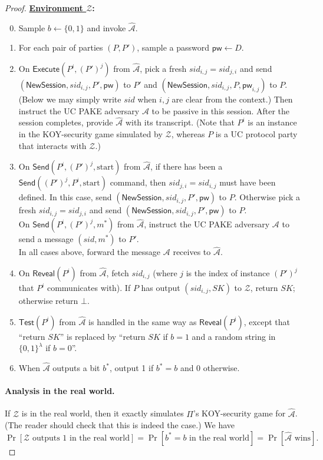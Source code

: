 \documentclass{article}
\newcommand{\adv}{\mathcal{A}}
\newcommand{\env}{\mathcal{Z}}
\newcommand{\pw}{\mathsf{pw}}
\newcommand{\NewSession}{\mathsf{NewSession}}
\newcommand{\Execute}{\mathsf{Execute}}
\newcommand{\Send}{\mathsf{Send}}
\newcommand{\Reveal}{\mathsf{Reveal}}
\newcommand{\Test}{\mathsf{Test}}
\begin{document}
\begin{proof}
\bigskip\noindent\textbf{\underline{Environment $\env$}:}
\begin{enumerate}
\setcounter{enumi}{-1}
  \item Sample $b \gets \{0,1\}$ and invoke $\widehat{\adv}$.
  \item For each pair of parties $(P, P')$, sample a password $\pw \gets D$.
  \item On $\Execute(P^i, (P')^j)$ from $\widehat{\adv}$, pick a fresh $sid_{i,j} = sid_{j,i}$ and send $(\NewSession, \allowbreak sid_{i,j}, P', \pw)$ to $P'$ and $(\NewSession, sid_{i,j}, P, \pw_{i,j})$ to $P$. (Below we may simply write $sid$ when $i,j$ are clear from the context.) Then instruct the UC PAKE adversary $\adv$ to be passive in this session. After the session completes, provide $\widehat{\adv}$ with its transcript. (Note that $P^i$ is an instance in the KOY-security game simulated by $\env$, whereas $P$ is a UC protocol party that interacts with $\env$.)
  \item On $\Send(P^i, (P')^j, \text{start})$ from $\widehat{\adv}$, if there has been a $\Send((P')^j, P^i, \text{start})$ command, then $sid_{j,i} = sid_{i,j}$ must have been defined. In this case, send $(\NewSession, sid_{i,j}, P', \pw)$ to $P$. Otherwise pick a fresh $sid_{i,j} = sid_{j,i}$ and send $(\NewSession, sid_{i,j}, P', \pw)$ to $P$. \\
      On $\Send(P^i, (P')^j, m^*)$ from $\widehat{\adv}$, instruct the UC PAKE adversary $\adv$ to send a message $(sid, m^*)$ to $P'$. \\
      In all cases above, forward the message $\adv$ receives to $\widehat{\adv}$.
  \item On $\Reveal(P^i)$ from $\widehat{\adv}$, fetch $sid_{i,j}$ (where $j$ is the index of instance $(P')^j$ that $P^i$ communicates with). If $P$ has output $(sid_{i,j}, SK)$ to $\env$, return $SK$; otherwise return $\bot$.
  \item $\Test(P^i)$ from $\widehat{\adv}$ is handled in the same way as $\Reveal(P^i)$, except that ``return $SK$'' is replaced by ``return $SK$ if $b = 1$ and a random string in $\{0,1\}^\lambda$ if $b = 0$''.
  \item When $\widehat{\adv}$ outputs a bit $b^*$, output 1 if $b^* = b$ and 0 otherwise.
\end{enumerate}
\paragraph{Analysis in the real world.}
If $\env$ is in the real world, then it exactly simulates $\Pi$'s KOY-security game for $\widehat{\adv}$. (The reader should check that this is indeed the case.) We have 
\[
\Pr[\env\text{ outputs }1\text{ in the real world}] = \Pr[b^* = b\text{ in the real world}] = \Pr[\widehat{\adv}\text{ wins}].
\]

\end{proof}
\end{document}

